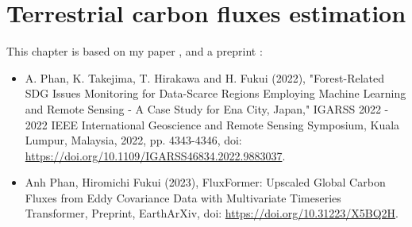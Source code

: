 \chapter{Terrestrial carbon fluxes estimation} \label{chap4}

\renewcommand{\headrulewidth}{0pt}
\lhead[\thepage]{\rightmark}
\rhead[\rightmark]{\thepage}
\cfoot[]{}

This chapter is based on my paper \citep{phan2022forest}, and a preprint \citep{fluxformer}:
\begin{itemize}
    \item A. Phan, K. Takejima, T. Hirakawa and H. Fukui (2022),  "Forest-Related SDG Issues Monitoring for Data-Scarce Regions Employing Machine Learning and Remote Sensing - A Case Study for Ena City, Japan," IGARSS 2022 - 2022 IEEE International Geoscience and Remote Sensing Symposium, Kuala Lumpur, Malaysia, 2022, pp. 4343-4346, doi: \url{https://doi.org/10.1109/IGARSS46834.2022.9883037}.
    \item Anh Phan, Hiromichi Fukui (2023), FluxFormer: Upscaled Global Carbon Fluxes from Eddy Covariance Data with Multivariate Timeseries Transformer, Preprint, EarthArXiv, doi: \url{https://doi.org/10.31223/X5BQ2H}.
\end{itemize}


